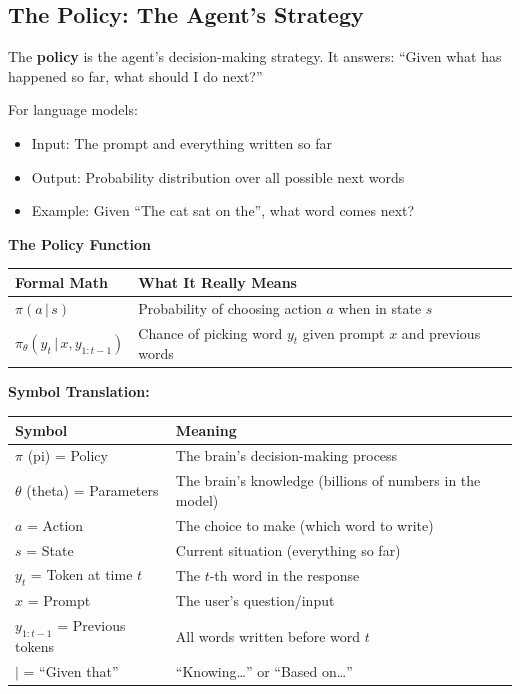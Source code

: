 \begin{chapterenv}
\subsection{The Policy: The Agent's Strategy}

The \textbf{policy} is the agent's decision-making strategy. It answers: ``Given what has happened so far, what should I do next?''

For language models:
\begin{itemize}[nosep]
    \item Input: The prompt and everything written so far
    \item Output: Probability distribution over all possible next words
    \item Example: Given ``The cat sat on the'', what word comes next?
\end{itemize}

\begin{infobox}
\textbf{The Policy Function}

\begin{center}
\begin{tabular}{p{}p{}}
\toprule
\textbf{Formal Math} & \textbf{What It Really Means} \\
\midrule
$\pi(a \,|\, s)$ & Probability of choosing action $a$ when in state $s$ \\
\midrule
$\pi_\theta(y_t \,|\, x, y_{1:t-1})$ & Chance of picking word $y_t$ given prompt $x$ and previous words \\
\bottomrule
\end{tabular}
\end{center}

\textbf{Symbol Translation:}

\begin{center}
\begin{tabular}{p{}p{}}
\toprule
\textbf{Symbol} & \textbf{Meaning} \\
\midrule
$\pi$ (pi) = Policy & The brain's decision-making process \\
$\theta$ (theta) = Parameters & The brain's knowledge (billions of numbers in the model) \\
$a$ = Action & The choice to make (which word to write) \\
$s$ = State & Current situation (everything so far) \\
$y_t$ = Token at time $t$ & The $t$-th word in the response \\
$x$ = Prompt & The user's question/input \\
$y_{1:t-1}$ = Previous tokens & All words written before word $t$ \\
$|$ = ``Given that'' & ``Knowing\ldots'' or ``Based on\ldots'' \\
\bottomrule
\end{tabular}
\end{center}


\end{infobox}
\end{chapterenv}
